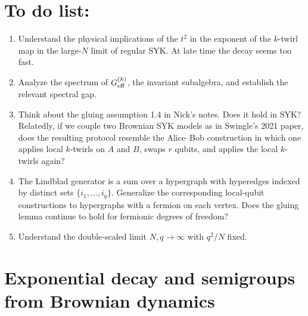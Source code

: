 \documentclass{article}
\theoremstyle{definition}
\begin{document}
\section*{To do list:}

\begin{enumerate}

\item Understand the physical implications of the $t^2$ in the exponent of
the $k$-twirl map in the large-$N$ limit of regular SYK.  At late time the
decay seems too fast.

\item Analyze the spectrum of $G_{\rm eff}^{(k)}$, the invariant subalgebra,
and establish the relevant spectral gap.

\item Think about the gluing assumption 1.4 in Nick's notes.  Does it hold in
SYK?  Relatedly, if we couple two Brownian SYK models as in Swingle's 2021
paper, does the resulting protocol resemble the Alice--Bob construction in
which one applies local $k$-twirls on $A$ and $B$, swaps $r$ qubits, and
applies the local $k$-twirls again?

\item The Lindblad generator is a sum over a hypergraph with hyperedges
indexed by distinct sets $\{i_1,\ldots,i_q\}$.  Generalize the corresponding
local-qubit constructions to hypergraphs with a fermion on each vertex.
Does the gluing lemma continue to hold for fermionic degrees of freedom?

\item Understand the double-scaled limit $N,q\to\infty$ with $q^2/N$ fixed.
\end{enumerate}

\section{Exponential decay and semigroups from Brownian dynamics}
\label{sec:brownian_general}
\end{document}
